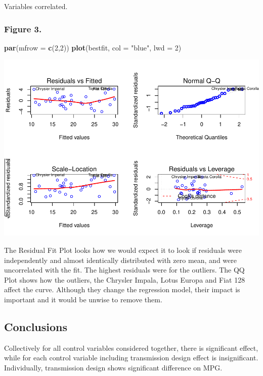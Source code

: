 \documentclass[]{article}
\newenvironment{Shaded}{\begin{snugshade}}{\end{snugshade}}
\newcommand{\DataTypeTok}[1]{\textcolor[rgb]{0.13,0.29,0.53}{#1}}
\newcommand{\DecValTok}[1]{\textcolor[rgb]{0.00,0.00,0.81}{#1}}
\newcommand{\KeywordTok}[1]{\textcolor[rgb]{0.13,0.29,0.53}{\textbf{#1}}}
\newcommand{\NormalTok}[1]{#1}
\newcommand{\StringTok}[1]{\textcolor[rgb]{0.31,0.60,0.02}{#1}}
\begin{document}
Variables correlated.

\hypertarget{figure-3.}{%
\subsubsection{Figure 3.}\label{figure-3.}}

\begin{Shaded}
\begin{Highlighting}[]
\KeywordTok{par}\NormalTok{(}\DataTypeTok{mfrow =} \KeywordTok{c}\NormalTok{(}\DecValTok{2}\NormalTok{,}\DecValTok{2}\NormalTok{))}
\KeywordTok{plot}\NormalTok{(bestfit, }\DataTypeTok{col =} \StringTok{"blue"}\NormalTok{, }\DataTypeTok{lwd =} \DecValTok{2}\NormalTok{)}
\end{Highlighting}
\end{Shaded}

\includegraphics{Motor_Trend_Data_Analysis_Final_Project_files/figure-latex/unnamed-chunk-12-1.pdf}

The Residual Fit Plot looks how we would expect it to look if residuals
were independently and almost identically distributed with zero mean,
and were uncorrelated with the fit. The highest residuals were for the
outliers. The QQ Plot shows how the outliers, the Chrysler Impala, Lotus
Europa and Fiat 128 affect the curve. Although they change the
regression model, their impact is important and it would be unwise to
remove them.

\hypertarget{conclusions}{%
\subsection{Conclusions}\label{conclusions}}

Collectively for all control variables considered together, there is
significant effect, while for each control variable including
transmission design effect is insignificant. Individually, transmission
design shows significant difference on MPG.
\end{document}

